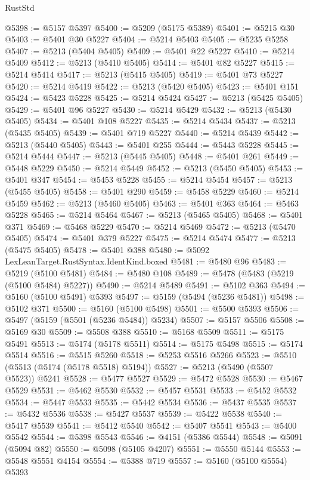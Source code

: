 \begin{lexlean}{RustStd}
\begin{coremodule}
@5398 := @5157 @5397
@5400 := @5209 (@5175 @5389)
@5401 := @5215 @30
@5403 := @5401 @30 @5227
@5404 := @5214 @5403
@5405 := @5235 @5258
@5407 := @5213 (@5404 @5405)
@5409 := @5401 @22 @5227
@5410 := @5214 @5409
@5412 := @5213 (@5410 @5405)
@5414 := @5401 @82 @5227
@5415 := @5214 @5414
@5417 := @5213 (@5415 @5405)
@5419 := @5401 @73 @5227
@5420 := @5214 @5419
@5422 := @5213 (@5420 @5405)
@5423 := @5401 @151
@5424 := @5423 @5228
@5425 := @5214 @5424
@5427 := @5213 (@5425 @5405)
@5429 := @5401 @96 @5227
@5430 := @5214 @5429
@5432 := @5213 (@5430 @5405)
@5434 := @5401 @108 @5227
@5435 := @5214 @5434
@5437 := @5213 (@5435 @5405)
@5439 := @5401 @719 @5227
@5440 := @5214 @5439
@5442 := @5213 (@5440 @5405)
@5443 := @5401 @255
@5444 := @5443 @5228
@5445 := @5214 @5444
@5447 := @5213 (@5445 @5405)
@5448 := @5401 @261
@5449 := @5448 @5229
@5450 := @5214 @5449
@5452 := @5213 (@5450 @5405)
@5453 := @5401 @347
@5454 := @5453 @5228
@5455 := @5214 @5454
@5457 := @5213 (@5455 @5405)
@5458 := @5401 @290
@5459 := @5458 @5229
@5460 := @5214 @5459
@5462 := @5213 (@5460 @5405)
@5463 := @5401 @363
@5464 := @5463 @5228
@5465 := @5214 @5464
@5467 := @5213 (@5465 @5405)
@5468 := @5401 @371
@5469 := @5468 @5229
@5470 := @5214 @5469
@5472 := @5213 (@5470 @5405)
@5474 := @5401 @379 @5227
@5475 := @5214 @5474
@5477 := @5213 (@5475 @5405)
@5478 := @5401 @388
@5480 := @5092 LexLeanTarget.RustSyntax.IdentKind.boxed
@5481 := @5480 @96
@5483 := @5219 (@5100 @5481)
@5484 := @5480 @108
@5489 := @5478 (@5483 (@5219 (@5100 @5484) @5227))
@5490 := @5214 @5489
@5491 := @5102 @363
@5494 := @5160 (@5100 @5491) @5393
@5497 := @5159 (@5494 (@5236 @5481))
@5498 := @5102 @371
@5500 := @5160 (@5100 @5498)
@5501 := @5500 @5393
@5506 := @5497 (@5159 (@5501 (@5236 @5484)) @5234)
@5507 := @5157 @5506
@5508 := @5169 @30
@5509 := @5508 @388
@5510 := @5168 @5509
@5511 := @5175 @5491
@5513 := @5174 (@5178 @5511)
@5514 := @5175 @5498
@5515 := @5174 @5514
@5516 := @5515 @5260
@5518 := @5253 @5516 @5266
@5523 := @5510 (@5513 (@5174 (@5178 @5518) @5194))
@5527 := @5213 (@5490 (@5507 @5523)) @5241
@5528 := @5477 @5527
@5529 := @5472 @5528
@5530 := @5467 @5529
@5531 := @5462 @5530
@5532 := @5457 @5531
@5533 := @5452 @5532
@5534 := @5447 @5533
@5535 := @5442 @5534
@5536 := @5437 @5535
@5537 := @5432 @5536
@5538 := @5427 @5537
@5539 := @5422 @5538
@5540 := @5417 @5539
@5541 := @5412 @5540
@5542 := @5407 @5541
@5543 := @5400 @5542
@5544 := @5398 @5543
@5546 := @4151 (@5386 @5544)
@5548 := @5091 (@5094 @82)
@5550 := @5098 (@5105 @4207)
@5551 := @5550 @5144
@5553 := @5548 @5551 @4154
@5554 := @5388 @719
@5557 := @5160 (@5100 @5554) @5393

\end{coremodule}
\end{lexlean}
